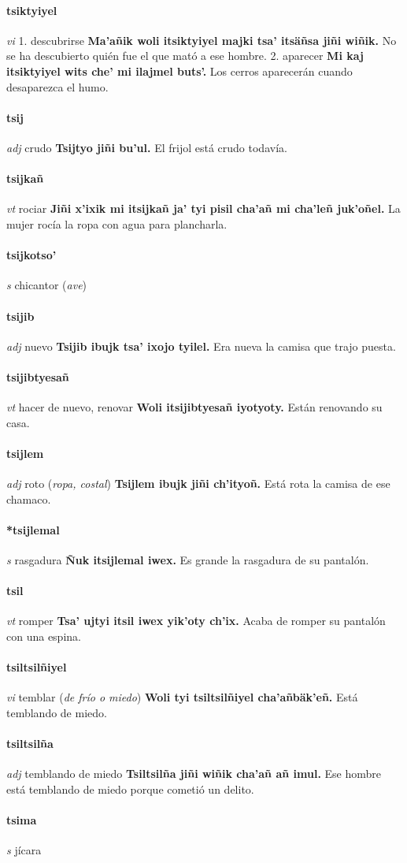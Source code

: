 \documentclass{scrbook}
\newcommand{\entry}[1]{\paragraph{#1}}
\newcommand{\onedefinition}[1]{#1.}
\newcommand{\partofspeech}[1]{\textit{#1}}
\newcommand{\spanishtranslation}[1]{#1}
\newcommand{\clarification}[1]{(\textit{#1})}
\newcommand{\cholexample}[1]{\textbf{#1}}
\newcommand{\exampletranslation}[1]{#1}
\begin{document}
\begin{multicols}{2}
\entry{tsiktyiyel}
\partofspeech{vi}
\onedefinition{1}
\spanishtranslation{descubrirse}
\cholexample{Ma'añik woli itsiktyiyel majki tsa' itsäñsa jiñi wiñik.}
\exampletranslation{No se ha descubierto quién fue el que mató a ese hombre.}
\onedefinition{2}
\spanishtranslation{aparecer}
\cholexample{Mi kaj itsiktyiyel wits che' mi ilajmel buts'.}
\exampletranslation{Los cerros aparecerán cuando desaparezca el humo.}

\entry{tsij}
\partofspeech{adj}
\spanishtranslation{crudo}
\cholexample{Tsijtyo jiñi bu'ul.}
\exampletranslation{El frijol está crudo todavía.}

\entry{tsijkañ}
\partofspeech{vt}
\spanishtranslation{rociar}
\cholexample{Jiñi x'ixik mi itsijkañ ja' tyi pisil cha'añ mi cha'leñ juk'oñel.}
\exampletranslation{La mujer rocía la ropa con agua para plancharla.}

\entry{tsijkotso'}
\partofspeech{s}
\spanishtranslation{chicantor}
\clarification{ave}

\entry{tsijib}
\partofspeech{adj}
\spanishtranslation{nuevo}
\cholexample{Tsijib ibujk tsa' ixojo tyilel.}
\exampletranslation{Era nueva la camisa que trajo puesta.}

\entry{tsijibtyesañ}
\partofspeech{vt}
\spanishtranslation{hacer de nuevo, renovar}
\cholexample{Woli itsijibtyesañ iyotyoty.}
\exampletranslation{Están renovando su casa.}

\entry{tsijlem}
\partofspeech{adj}
\spanishtranslation{roto}
\clarification{ropa, costal}
\cholexample{Tsijlem ibujk jiñi ch'ityoñ.}
\exampletranslation{Está rota la camisa de ese chamaco.}

\entry{*tsijlemal}
\partofspeech{s}
\spanishtranslation{rasgadura}
\cholexample{Ñuk itsijlemal iwex.}
\exampletranslation{Es grande la rasgadura de su pantalón.}

\entry{tsil}
\partofspeech{vt}
\spanishtranslation{romper}
\cholexample{Tsa' ujtyi itsil iwex yik'oty ch'ix.}
\exampletranslation{Acaba de romper su pantalón con una espina.}

\entry{tsiltsilñiyel}
\partofspeech{vi}
\spanishtranslation{temblar}
\clarification{de frío o miedo}
\cholexample{Woli tyi tsiltsilñiyel cha'añbäk'eñ.}
\exampletranslation{Está temblando de miedo.}

\entry{tsiltsilña}
\partofspeech{adj}
\spanishtranslation{temblando de miedo}
\cholexample{Tsiltsilña jiñi wiñik cha'añ añ imul.}
\exampletranslation{Ese hombre está temblando de miedo porque cometió un delito.}

\entry{tsima}
\partofspeech{s}
\spanishtranslation{jícara}


\end{multicols}
\end{document}
